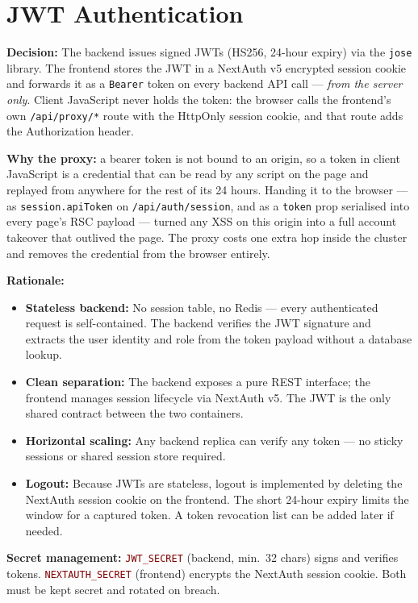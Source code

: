 \documentclass[12pt,a4paper,twoside]{report}
\newcommand{\code}[1]{\texttt{#1}}
\newcommand{\env}[1]{\texttt{\textcolor{Maroon}{#1}}}
\begin{document}
\section{JWT Authentication}
\label{sec:jwt-auth}

\textbf{Decision:} The backend issues signed JWTs (HS256, 24-hour
expiry) via the \code{jose} library. The frontend stores the JWT in
a NextAuth v5 encrypted session cookie and forwards it as a
\code{Bearer} token on every backend API call --- \emph{from the server only}.
Client JavaScript never holds the token: the browser calls the frontend's own
\code{/api/proxy/*} route with the HttpOnly session cookie, and that route adds
the Authorization header.

\textbf{Why the proxy:} a bearer token is not bound to an origin, so a token in
client JavaScript is a credential that can be read by any script on the page and
replayed from anywhere for the rest of its 24 hours. Handing it to the browser
--- as \code{session.apiToken} on \code{/api/auth/session}, and as a
\code{token} prop serialised into every page's RSC payload --- turned any XSS on
this origin into a full account takeover that outlived the page. The proxy costs
one extra hop inside the cluster and removes the credential from the browser
entirely.

\textbf{Rationale:}
\begin{itemize}
  \item \textbf{Stateless backend:} No session table, no Redis — every
        authenticated request is self-contained. The backend verifies
        the JWT signature and extracts the user identity and role from
        the token payload without a database lookup.
  \item \textbf{Clean separation:} The backend exposes a pure REST
        interface; the frontend manages session lifecycle via NextAuth v5.
        The JWT is the only shared contract between the two containers.
  \item \textbf{Horizontal scaling:} Any backend replica can verify any
        token — no sticky sessions or shared session store required.
  \item \textbf{Logout:} Because JWTs are stateless, logout is
        implemented by deleting the NextAuth session cookie on the
        frontend. The short 24-hour expiry limits the window for a
        captured token. A token revocation list can be added later if
        needed.
\end{itemize}

\textbf{Secret management:} \env{JWT\_SECRET} (backend, min.\ 32 chars)
signs and verifies tokens. \env{NEXTAUTH\_SECRET} (frontend) encrypts the
NextAuth session cookie. Both must be kept secret and rotated on breach.
\end{document}
